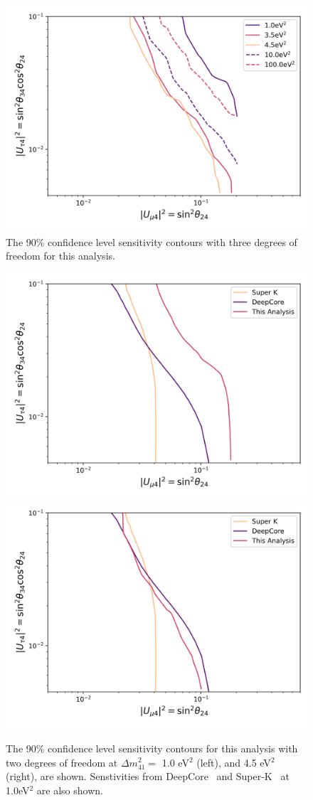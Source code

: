 \documentclass[main.tex]{subfiles}
\begin{document}
\begin{figure}
    \centering
    \includegraphics[width=0.7\linewidth]{figures/cascade_mcllheff_final_Realization_Asimov_sterile_0_cl0.9_dof3.png}
    \caption{The 90\% confidence level sensitivity contours with three degrees of freedom for this analysis.}\label{fig:asimov_sense}
\end{figure}

\begin{figure}
    \centering
    \includegraphics[width=0.45\linewidth]{figures/comparison.png}%
    \includegraphics[width=0.45\linewidth]{figures/comparison_45.png}%
    \caption{The 90\% confidence level sensitivity contours for this analysis with two degrees of freedom at $\Delta m_{41}^{2}=$ 1.0 eV$^{2}$ (left), and  4.5 eV$^{2}$ (right), are shown. Senstivities from DeepCore~\cite{Aartsen_2017_dc} and Super-K~\cite{PhysRevD.91.052019} at 1.0eV$^{2}$ are also shown.}\label{fig:asimov_compare}
\end{figure}
\end{document}
